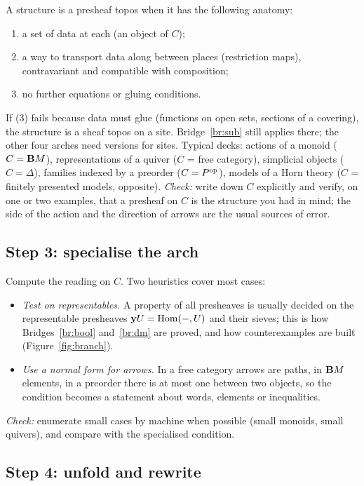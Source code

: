 A structure is a presheaf topos when it has the following anatomy:
\begin{enumerate}
\item a set of data at each  (an object of $C$);
\item a way to transport data along  between places (restriction maps), contravariant and compatible with composition;
\item no further equations or gluing conditions.
\end{enumerate}
If (3) fails because data must glue (functions on open sets, sections of a covering), the structure is a sheaf topos on a site. Bridge~\ref{br:sub} still applies there; the other four arches need versions for sites. Typical decks: actions of a monoid ($C = \mathbf{B} M$), representations of a quiver ($C$ = free category), simplicial objects ($C = \Delta$), families indexed by a preorder ($C = P^{\mathrm{op}}$), models of a Horn theory ($C$ = finitely presented models, opposite). \emph{Check:} write down $C$ explicitly and verify, on one or two examples, that a presheaf on $C$ is the structure you had in mind; the side of the action and the direction of arrows are the usual sources of error.

\subsection{Step 3: specialise the arch}

Compute the reading on $C$. Two heuristics cover most cases:
\begin{itemize}
\item \emph{Test on representables.} A property of all presheaves is usually decided on the representable presheaves $\mathbf{y} U = \operatorname{Hom}(-,U)$ and their sieves; this is how Bridges~\ref{br:bool} and~\ref{br:dm} are proved, and how counterexamples are built (Figure~\ref{fig:branch}).
\item \emph{Use a normal form for arrows.} In a free category arrows are paths, in $\mathbf{B} M$ elements, in a preorder there is at most one between two objects, so the condition becomes a statement about words, elements or inequalities.
\end{itemize}
\emph{Check:} enumerate small cases by machine when possible (small monoids, small quivers), and compare with the specialised condition.

\subsection{Step 4: unfold and rewrite}

